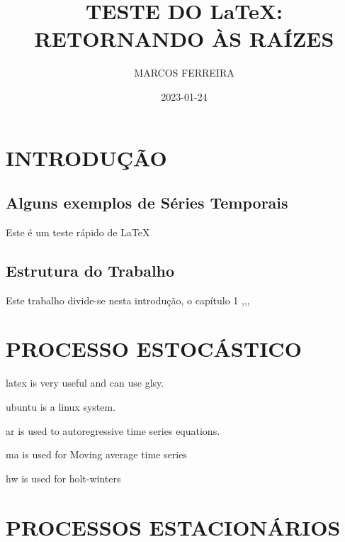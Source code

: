 \documentclass[12pt,a4paper]{book}
\title{TESTE DO \LaTeX: RETORNANDO ÀS RAÍZES}
\author{MARCOS FERREIRA}
\date{2023-01-24}
\begin{document}
	\maketitle
	\tableofcontents{} 
	\chapter{INTRODUÇÃO}
	\section{Alguns exemplos de Séries Temporais}
		Este é um teste rápido de \LaTeX 
	\section{Estrutura do Trabalho}
		Este trabalho divide-se nesta introdução, o capítulo 1 ,\cite{dinardo1997econometric,morettin2018analise}\cite{tripathi2000econometric,hamilton2020time},\cite{de2018tendencias,shumway2000time}, \cite{fischer1982series}
	
	\chapter{PROCESSO ESTOCÁSTICO}
	\Gls{latex} is very useful and can use \gls{glsy}.
	
	\gls{ubuntu} is a \gls{linux} system.
	
	\acrlong{ar} is used to autoregressive time series equations.
	
	\acrshort{ma} is used for Moving average time series
	
	\acrshort{hw} is used for holt-winters
	
	\chapter{PROCESSOS ESTACIONÁRIOS}
	\printglossaries
	
		
	\clearpage
\end{document}
